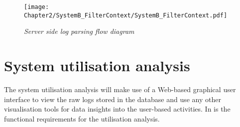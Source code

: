 \begin{figure}[!htb]
	\centering
	\texttt{[image: Chapter2/SystemB\_FilterContext/SystemB\_FilterContext.pdf]}
	\caption[Server side log parsing flow diagram]
	{\textit{Server side log parsing flow diagram}}\label{fig:ch2_loggingParse}
\end{figure}

\clearpage

\section{System utilisation analysis}\label{ch2:sec_system_utilisation_analysis}
The system utilisation analysis will make use of a Web-based graphical user interface to view the raw logs stored in the database and use any other visualisation tools for data insights into the user-based activities. In  is the functional requirements for the utilisation analysis.

